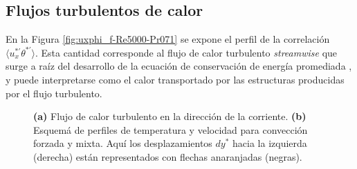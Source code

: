 \subsection{Flujos turbulentos de calor} 

En la Figura \ref{fig:uxphi_f-Re5000-Pr071} se expone el perfil de la correlación $\langle u_x^{\ast \prime } \theta^{\ast \prime } \rangle$. Esta cantidad corresponde al flujo de calor turbulento \textit{streamwise} que surge a raíz del desarrollo de la ecuación de conservación de energía promediada \cite{kundu,pope2001turbulent}, y puede interpretarse como el calor transportado por las estructuras producidas por el flujo turbulento. 

\begin{figure}[H]
  \centering
    \caption{\textbf{(a)} Flujo de calor turbulento en la dirección de la corriente. \textbf{(b)} Esquemá de perfiles de temperatura y velocidad para convección forzada y mixta. Aquí los desplazamientos $dy^*$ hacia la izquierda (derecha) están representados con flechas anaranjadas (negras).}
    \label{fig:rms-Re5000-Pr071}
\end{figure}


